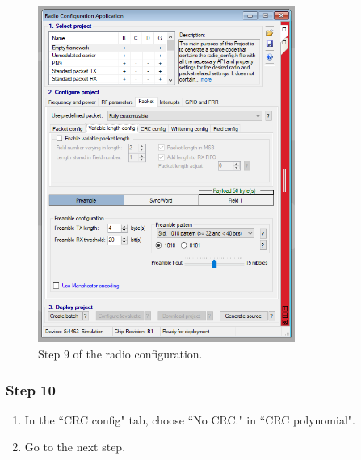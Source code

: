 \begin{figure}[!h]
	\begin{center}
		\includegraphics[width=0.75\textwidth]{figures/wds-tutorial/wds-tutorial-9.png}
		\caption{Step 9 of the radio configuration.}
		\label{fig:wds-tutorial-step-9}
	\end{center}
\end{figure}

\subsubsection{Step 10}

\begin{enumerate}
    \item In the ``CRC config" tab, choose ``No CRC." in ``CRC polynomial".
    \item Go to the next step.
\end{enumerate}

